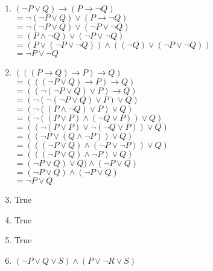 \documentclass[10.5pt]{article}
\newenvironment{solution}[2][Solution]{ \begin{trivlist}
\item[\hskip \labelsep {\bfseries #1}]}{\end{trivlist}}
\begin{document}
\begin{solution}{6}
\begin{enumerate}
\item $(\neg P \vee Q)\rightarrow (P \rightarrow \neg Q)$\\
$= \neg (\neg P \vee Q)\vee (P \rightarrow \neg Q)$\\
$= \neg (\neg P \vee Q)\vee (\neg P \vee \neg Q)$\\
$= (P \wedge \neg Q)\vee (\neg P \vee \neg Q)$\\
$= (P \vee (\neg P \vee \neg Q))\wedge ((\neg Q)\vee (\neg P \vee \neg Q))$\\
$= \neg P \vee  \neg Q$\\
\item $(((P \rightarrow Q)\rightarrow P)\rightarrow Q) $\\
$= (((\neg P \vee Q)\rightarrow P)\rightarrow Q) $\\
$= ((\neg (\neg P \vee Q)\vee P)\rightarrow Q) $\\
$= (\neg (\neg (\neg P \vee Q)\vee P)\vee Q) $\\
$= (\neg ((P \wedge  \neg Q)\vee P)\vee Q) $\\
$= (\neg ((P \vee P)\wedge  (\neg Q\vee P))\vee Q) $\\
$= ((\neg (P \vee P)\vee \neg (\neg Q\vee P))\vee Q) $\\
$= ((\neg P \vee (Q\wedge  \neg P))\vee Q) $\\
$= (((\neg P \vee Q)\wedge  (\neg P \vee \neg P))\vee Q) $\\
$= (((\neg P \vee Q)\wedge  \neg P)\vee Q) $\\
$= (\neg P \vee Q)\vee Q)\wedge  (\neg P \vee Q) $\\
$= (\neg P \vee Q)\wedge  (\neg P \vee Q)$\\
$= \neg P \vee  Q $
\item True
\item True
\item True
\item $(\lnot P \vee Q \vee S) \wedge (P \vee \lnot R \vee S)$\\


\end{enumerate}
\end{solution}
\end{document}
